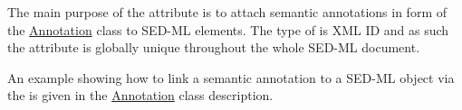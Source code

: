 \subsubsection{}
\label{sec:metaID}
The main purpose of the  attribute is to attach semantic annotations in form of the \hyperref[class:annotation]{Annotation} class to SED-ML elements.  The type of  is XML ID and as such the  attribute is globally unique throughout the whole SED-ML document. 

An example showing how to link a semantic annotation to a SED-ML object via the  is given in the \hyperref[class:annotation]{Annotation} class description.

